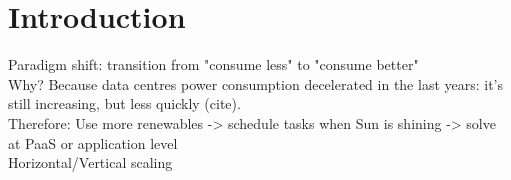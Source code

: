 \section{Introduction}
\label{sec: intro}

Paradigm shift: transition from "consume less" to "consume better" \\
Why? Because data centres power consumption decelerated in the last years: it's still increasing, but less quickly (cite). \\

Therefore: Use more renewables -> schedule tasks when Sun is shining -> solve at PaaS or application level \\
Horizontal/Vertical scaling \\


